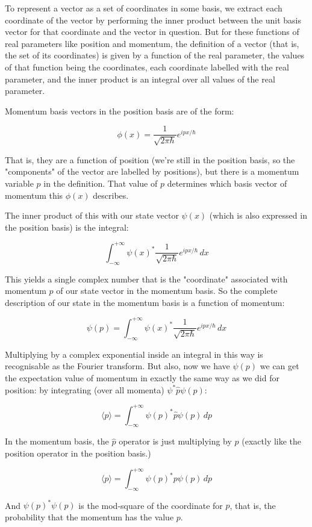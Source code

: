 To represent a vector as a set of coordinates in some basis, we extract each coordinate of the vector by performing the inner product between the unit basis vector for that coordinate and the vector in question. But for these functions of real parameters like position and momentum, the definition of a vector (that is, the set of its coordinates) is given by a function of the real parameter, the values of that function being the coordinates, each coordinate labelled with the real parameter, and the inner product is an integral over all values of the real parameter.

Momentum basis vectors in the position basis are of the form:

$$
\phi(x) = \frac{1}{\sqrt{2\pi\hbar}}e^{ipx/\hbar}
$$

That is, they are a function of position (we're still in the position basis, so the "components" of the vector are labelled by positions), but there is a momentum variable $p$ in the definition. That value of $p$ determines which basis vector of momentum this $\phi(x)$ describes.

The inner product of this with our state vector $\psi(x)$ (which is also expressed in the position basis) is the integral:

$$
\int_{-\infty}^{+\infty}
\psi(x)^*
\frac{1}{\sqrt{2\pi\hbar}}e^{ipx/\hbar}
\,dx
$$

This yields a single complex number that is the "coordinate" associated with momentum $p$ of our state vector in the momentum basis. So the complete description of our state in the momentum basis is a function of momentum:

$$
\psi(p) = \int_{-\infty}^{+\infty}
\psi(x)^*
\frac{1}{\sqrt{2\pi\hbar}}e^{ipx/\hbar}
\,dx
$$

Multiplying by a complex exponential inside an integral in this way is recognisable as the Fourier transform. But also, now we have $\psi(p)$ we can get the expectation value of momentum in exactly the same way as we did for position: by integrating (over all momenta) $\psi^* \hat{p} \psi(p)$:

$$
\langle p \rangle =
\int_{-\infty}^{+\infty}
\psi(p)^*
\hat{p}
\psi(p)
\,dp
$$

In the momentum basis, the $\hat{p}$ operator is just multiplying by $p$ (exactly like the position operator in the position basis.)

$$
\langle p \rangle =
\int_{-\infty}^{+\infty}
\psi(p)^*
p
\psi(p)
\,dp
$$

And $\psi(p)^*\psi(p)$ is the mod-square of the coordinate for $p$, that is, the probability that the momentum has the value $p$. 

